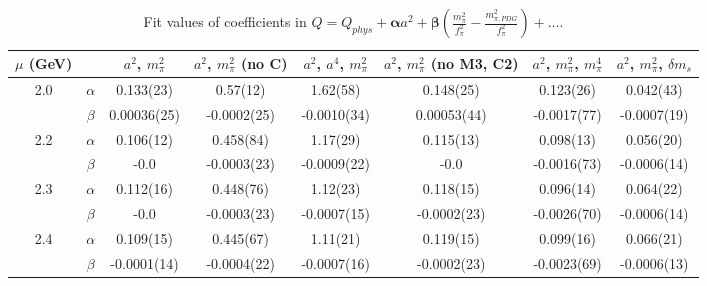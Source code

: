 \documentclass[12pt]{extarticle}
\begin{document}
\begin{table}[h!]
\begin{center}
\begin{tabular}{|c c|c|c|c|c|c|c|}
\hline
$\mu$ (GeV) &  & $a^2$, $m_\pi^2$& $a^2$, $m_\pi^2$ (no C)& $a^2$, $a^4$, $m_\pi^2$& $a^2$, $m_\pi^2$ (no M3, C2)& $a^2$, $m_\pi^2$, $m_\pi^4$& $a^2$, $m_\pi^2$, $\delta m_s$\\
\hline
\multirow{2}{0.5in}{2.0} & $\alpha$ & 0.133(23)& 0.57(12)& 1.62(58)& 0.148(25)& 0.123(26)& 0.042(43)\\
 & $\beta$ & 0.00036(25)& -0.0002(25)& -0.0010(34)& 0.00053(44)& -0.0017(77)& -0.0007(19)\\
\hline
\multirow{2}{0.5in}{2.2} & $\alpha$ & 0.106(12)& 0.458(84)& 1.17(29)& 0.115(13)& 0.098(13)& 0.056(20)\\
 & $\beta$ & -0.0& -0.0003(23)& -0.0009(22)& -0.0& -0.0016(73)& -0.0006(14)\\
\hline
\multirow{2}{0.5in}{2.3} & $\alpha$ & 0.112(16)& 0.448(76)& 1.12(23)& 0.118(15)& 0.096(14)& 0.064(22)\\
 & $\beta$ & -0.0& -0.0003(23)& -0.0007(15)& -0.0002(23)& -0.0026(70)& -0.0006(14)\\
\hline
\multirow{2}{0.5in}{2.4} & $\alpha$ & 0.109(15)& 0.445(67)& 1.11(21)& 0.119(15)& 0.099(16)& 0.066(21)\\
 & $\beta$ & -0.0001(14)& -0.0004(22)& -0.0007(16)& -0.0002(23)& -0.0023(69)& -0.0006(13)\\
\hline
\end{tabular}
\caption{Fit values of coefficients in $Q = Q_{phys} + \mathbf{\alpha} a^2 + \mathbf{\beta}\left(\frac{m_\pi^2}{f_\pi^2}-\frac{m_{\pi,PDG}^2}{f_\pi^2}\right) + \ldots$.}
\end{center}
\end{table}
























\clearpage
\end{document}
